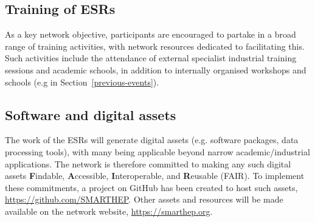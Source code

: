 \subsection{Training of ESRs}
\label{training}
As a key network objective, participants are encouraged to partake in a broad range of training activities, with network resources dedicated to facilitating this. Such activities include the attendance of external specialist industrial training sessions and academic schools, in addition to internally organised workshops and schools (e.g in Section~\ref{previous-events}).

\subsection{Software and digital assets}
\label{software}
The work of the ESRs will generate digital assets (e.g. software packages, data processing tools), with many being applicable beyond narrow academic/industrial applications. The network is therefore committed to making any such digital assets \textbf{F}indable, \textbf{A}ccessible, \textbf{I}nteroperable, and \textbf{R}eusable (FAIR). \cite{FAIR-principles} To implement these commitments, a project on GitHub has been created to host such assets, \url{https://github.com/SMARTHEP}. Other assets and resources will be made available on the network website, \url{https://smarthep.org}.